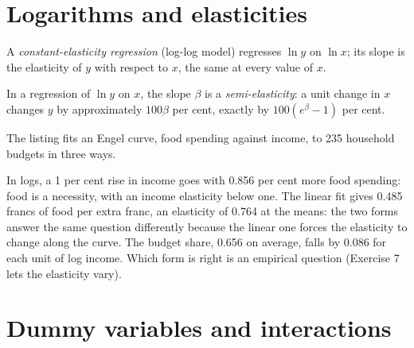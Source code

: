 \section{Logarithms and elasticities}\label{sec:b2:specification:logs}

\begin{definition}\label{def:b2:specification:log-log}
A \emph{constant-elasticity regression} (log-log model) regresses $\ln y$ on $\ln
x$; its slope is the elasticity of $y$ with respect to $x$, the same at every value of $x$.
\end{definition}

\begin{definition}\label{def:b2:specification:semi-elasticity}
In a regression of $\ln y$ on $x$, the slope $\beta$ is a \emph{semi-elasticity}: a unit change in
$x$ changes $y$ by approximately $100\beta$ per cent, exactly by $100(e^\beta - 1)$ per cent.
\end{definition}

The listing fits an Engel curve, food spending against income, to 235 household budgets in three ways.

\label{lst:b2:specification:engel}

\label{out:b2:specification:engel}

In logs, a 1 per cent rise in income goes with 0.856 per cent more food spending: food is a necessity, with an income
elasticity below one. The linear fit gives 0.485 francs of food per extra franc, an elasticity of 0.764 at the means: the
two forms answer the same question differently because the linear one forces the elasticity to change along the curve.
The budget share, 0.656 on average, falls by 0.086 for each unit of log income. Which form is right is an empirical
question (Exercise 7 lets the elasticity vary).

\section{Dummy variables and interactions}\label{sec:b2:specification:dummies}

